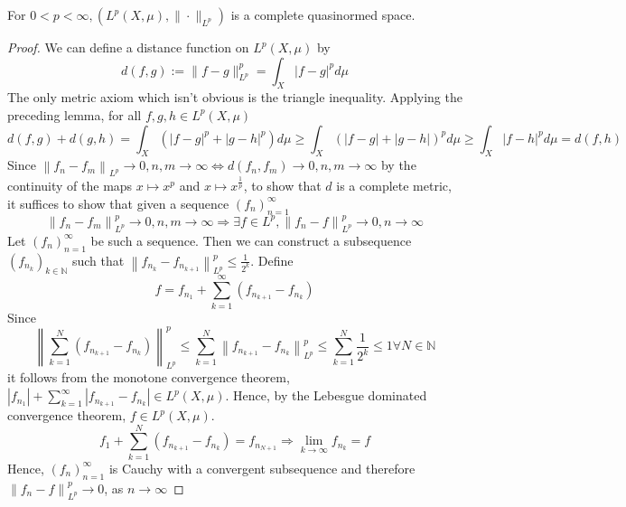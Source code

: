 \begin{proposition}
    For $0<p<\infty,\left(L^{p}(X, \mu),\|\cdot\|_{L^{p}}\right)$ is a complete quasinormed space.
\end{proposition}
\begin{proof}
    We can define a distance function on $L^{p}(X, \mu)$ by
    \[
        d(f, g):=\|f-g\|_{L^{p}}^{p}=\int_{X}|f-g|^{p} d \mu
    \]
    The only metric axiom which isn't obvious is the triangle inequality. Applying the preceding lemma, for all $f, g, h \in L^{p}(X, \mu)$
    \[
        d(f, g)+d(g, h)=\int_{X}\left(|f-g|^{p}+|g-h|^{p}\right) d \mu \geq \int_{X}(|f-g|+|g-h|)^{p} d \mu \geq \int_{X}|f-h|^{p} d \mu=d(f, h)
    \]
    Since $\left\|f_{n}-f_{m}\right\|_{L^{p}} \rightarrow 0, n, m \rightarrow \infty \Longleftrightarrow d\left(f_{n}, f_{m}\right) \rightarrow 0, n, m \rightarrow \infty$ by the continuity of the maps $x \mapsto x^{p}$ and $x \mapsto x^{\frac{1}{p}}$, to show that $d$ is a complete metric, it suffices to show that given a sequence $\left(f_{n}\right)_{n=1}^{\infty}$
    \[
        \left\|f_{n}-f_{m}\right\|_{L^{p}}^{p} \rightarrow 0, n, m \rightarrow \infty \Rightarrow \exists f \in L^{p},\left\|f_{n}-f\right\|_{L^{p}}^{p} \rightarrow 0, n \rightarrow \infty
    \]
    Let $\left(f_{n}\right)_{n=1}^{\infty}$ be such a sequence. Then we can construct a subsequence $\left(f_{n_{k}}\right)_{k \in \mathbb{N}}$ such that $\left\|f_{n_{k}}-f_{n_{k+1}}\right\|_{L^{p}}^{p} \leq \frac{1}{2^{k}}$. Define
    \[
        f=f_{n_{1}}+\sum_{k=1}^{\infty}\left(f_{n_{k+1}}-f_{n_{k}}\right)
    \]
    Since
    \[
        \left\|\sum_{k=1}^{N}\left(f_{n_{k+1}}-f_{n_{k}}\right)\right\|_{L^{p}}^{p} \leq \sum_{k=1}^{N}\left\|f_{n_{k+1}}-f_{n_{k}}\right\|_{L^{p}}^{p} \leq \sum_{k=1}^{N} \frac{1}{2^{k}} \leq 1 \forall N \in \mathbb{N}
    \]
    it follows from the monotone convergence theorem, $\left|f_{n_{1}}\right|+\sum_{k=1}^{\infty}\left|f_{n_{k+1}}-f_{n_{k}}\right| \in L^{p}(X, \mu) .$ Hence, by the Lebesgue dominated convergence theorem, $f \in L^{p}(X, \mu)$.
    \[
    f_{1}+\sum_{k=1}^{N}\left(f_{n_{k+1}}-f_{n_{k}}\right)=f_{n_{N+1}} \Rightarrow \lim _{k \rightarrow \infty} f_{n_{k}}=f
    \]
    Hence, $\left(f_{n}\right)_{n=1}^{\infty}$ is Cauchy with a convergent subsequence and therefore $\left\|f_{n}-f\right\|_{L^{p}}^{p} \rightarrow 0$, as $n \rightarrow \infty$
\end{proof}
